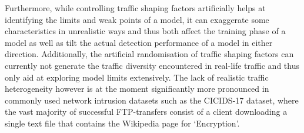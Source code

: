 \documentclass[conference]{IEEEtran}
\begin{document}
Furthermore, while controlling traffic shaping factors artificially helps at identifying the limits and weak points of a model, it can exaggerate some characteristics in unrealistic ways and thus both affect the training phase of a model as well as tilt the actual detection performance of a model in either direction. Additionally, the artificial randomisation of traffic shaping factors can currently not generate the traffic diversity encountered in real-life traffic and thus only aid at exploring model limits extensively. The lack of realistic traffic heterogeneity however is at the moment significantly more pronounced in commonly used network intrusion datasets such as the CICIDS-17 dataset, where the vast majority of successful FTP-transfers consist of a client downloading a single text file that contains the Wikipedia page for ‘Encryption’.










 


\end{document}
